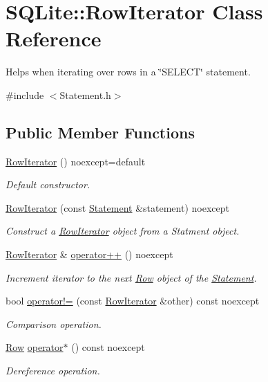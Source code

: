 \hypertarget{a00012}{\section{S\-Q\-Lite\-:\-:Row\-Iterator Class Reference}
\label{a00012}
}


Helps when iterating over rows in a \char`\"{}\-S\-E\-L\-E\-C\-T\char`\"{} statement.  




{\ttfamily \#include $<$Statement.\-h$>$}

\subsection*{Public Member Functions}
\begin{DoxyCompactItemize}
\item 
\hypertarget{a00012_aa04c70861d8dbca32b8073ddd36a0ef5}{\hyperlink{a00012_aa04c70861d8dbca32b8073ddd36a0ef5}{Row\-Iterator} () noexcept=default}\label{a00012_aa04c70861d8dbca32b8073ddd36a0ef5}

\begin{DoxyCompactList}\small\item\em Default constructor. \end{DoxyCompactList}\item 
\hyperlink{a00012_ad3927378b109ab3dfd6f86d8326f609c}{Row\-Iterator} (const \hyperlink{a00013}{Statement} \&statement) noexcept
\begin{DoxyCompactList}\small\item\em Construct a \hyperlink{a00012}{Row\-Iterator} object from a Statment object. \end{DoxyCompactList}\item 
\hypertarget{a00012_a55c22680d983bd87d068bb304dbb1508}{\hyperlink{a00012}{Row\-Iterator} \& \hyperlink{a00012_a55c22680d983bd87d068bb304dbb1508}{operator++} () noexcept}\label{a00012_a55c22680d983bd87d068bb304dbb1508}

\begin{DoxyCompactList}\small\item\em Increment iterator to the next \hyperlink{a00011}{Row} object of the \hyperlink{a00013}{Statement}. \end{DoxyCompactList}\item 
\hypertarget{a00012_ab5a2045335ee19bb897381b51b013a48}{bool \hyperlink{a00012_ab5a2045335ee19bb897381b51b013a48}{operator!=} (const \hyperlink{a00012}{Row\-Iterator} \&other) const noexcept}\label{a00012_ab5a2045335ee19bb897381b51b013a48}

\begin{DoxyCompactList}\small\item\em Comparison operation. \end{DoxyCompactList}\item 
\hyperlink{a00011}{Row} \hyperlink{a00012_a1e27980d666a42f9835c919f8b9c93b1}{operator$\ast$} () const noexcept
\begin{DoxyCompactList}\small\item\em Dereference operation. \end{DoxyCompactList}\end{DoxyCompactItemize}


